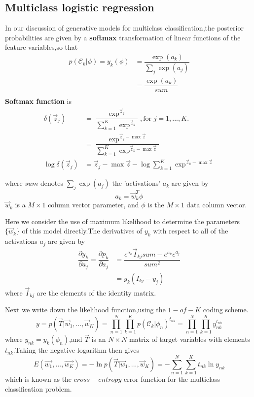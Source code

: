 \subsection{Multiclass logistic regression}
In our discussion of generative models for multiclass classification,the posterior probabilities are given by a \textbf{softmax} transformation of linear functions of the feature variables,so that
\begin{align}
p(\mathcal{C}_k|\phi) = y_k(\phi) &= \dfrac{\exp(a_k)}{\sum_j\exp(a_j)}\\
&=\dfrac{\exp(a_k)}{sum} \\
\end{align}
\textbf{Softmax function} is 
\begin{align}
\delta(\vec{z}_j) &= \dfrac{\exp^{\vec{z}_j}}{\sum_{k=1}^{K}\exp^{\vec{z}_k}},\text{for } j=1,...,K.  \\
&=\dfrac{\exp^{\vec{z}_j-\max{\vec{z}}}}{\sum_{k=1}^{K}\exp^{\vec{z}_k - \max{\vec{z}}}} \\
\log \delta(\vec{z}_j) &= \vec{z}_j-\max{\vec{z}}-\log\sum_{k=1}^{K}\exp^{\vec{z}_k - \max{\vec{z}}}
\end{align}

where $sum$ denotes $\sum_j\exp(a_j)$ the 'activations' $a_k$ are given by
\begin{equation}
a_k = \vec{w}_k^T\phi
\end{equation}
$\vec{w}_k$ is a $M\times 1$ column vector parameter, and $\phi$ is the $M \times 1$ data column vector.
	
Here we consider the use of maximum likelihood to determine the parameters $\{\vec{w}_k\}$ of this model directly.The derivatives of $y_k$ with respect to all of the activations $a_j$ are given by 
\begin{align}
\dfrac{\partial y_k}{\partial a_j} = \dfrac{\partial p_k}{\partial a_j} 
&=\dfrac{e^{a_k}\vec{I}_{kj}sum-e^{a_k}e^{a_j}}{sum^2} \\
&=y_k(I_{kj}-y_j)
\end{align}
where $\vec{I}_{kj}$ are the elements of the identity matrix.

Next we write down the likelihood function,using the $1-of-K$ coding scheme.
\begin{equation}
y = p(\vec{T}|\vec{w}_1,...,\vec{w}_K)=
\prod_{n=1}^{N}\prod_{k=1}^{K}p(\mathcal{C}_k|\phi_n)^{t_{nk}}
=\prod_{n=1}^{N}\prod_{k=1}^{K}y_{nk}^{t_{nk}}
\end{equation}
where $y_{nk}=y_k(\phi_n)$,and $\vec{T}$ is an $N\times N$ matrix of target variables with elements $t_{nk}$.Taking the negative logarithm then gives
\begin{equation}
E(\vec{w_1},...,\vec{w_K})=-\ln p(\vec{T}|\vec{w}_1,...,\vec{w}_K)
=-\sum_{n=1}^{N}\sum_{k=1}^{K}t_{nk}\ln y_{nk}
\end{equation}
which is known as the $cross-entropy$ error function for the multiclass classification problem.

